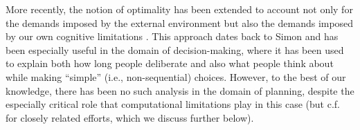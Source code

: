 More recently, the notion of optimality has been extended to account not only for the demands imposed by the external environment but also the demands imposed by our own cognitive limitations \citep{howes2009rational,lewis2014computational,gershman2015computational,griffiths2015rational,lieder2020resourcerational}. This approach dates back to Simon \citep{simon1955behavioral} and has been especially useful in the domain of decision-making, where it has been used to explain both how long people deliberate \citep{bogacz2006physics,drugowitsch2012cost,tajima2016optimal,tajima2019optimal,fudenberg2018speed} and also what people think about \citep{callaway2021fixation,jang2021optimal} while making ``simple'' (i.e., non-sequential) choices. However, to the best of our knowledge, there has been no such analysis in the domain of planning, despite the especially critical role that computational limitations play in this case (but c.f. \citep{sezener2019optimizing,mattar2018prioritized} for closely related efforts, which we discuss further below).
















